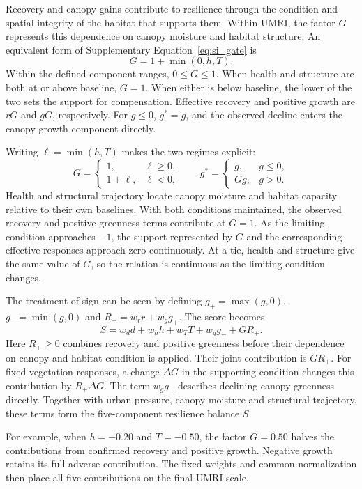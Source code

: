 Recovery and canopy gains contribute to resilience through the condition and spatial integrity of the habitat that supports them. Within UMRI, the factor $G$ represents this dependence on canopy moisture and habitat structure. An equivalent form of Supplementary Equation~\eqref{eq:si_gate} is
\begin{equation}\label{eq:si_gate_min}
G=1+\min(0,h,T).
\end{equation}
Within the defined component ranges, $0\leq G\leq1$. When health and structure are both at or above baseline, $G=1$. When either is below baseline, the lower of the two sets the support for compensation. Effective recovery and positive growth are $rG$ and $gG$, respectively. For $g\leq0$, $g^\ast=g$, and the observed decline enters the canopy-growth component directly.

Writing $\ell=\min(h,T)$ makes the two regimes explicit:
\[
G=\begin{cases}1,&\ell\geq0,\\1+\ell,&\ell<0,\end{cases}
\qquad
g^\ast=\begin{cases}g,&g\leq0,\\Gg,&g>0.\end{cases}
\]
Health and structural trajectory locate canopy moisture and habitat capacity relative to their own baselines. With both conditions maintained, the observed recovery and positive greenness terms contribute at $G=1$. As the limiting condition approaches $-1$, the support represented by $G$ and the corresponding effective responses approach zero continuously. At a tie, health and structure give the same value of $G$, so the relation is continuous as the limiting condition changes.

The treatment of sign can be seen by defining $g_+=\max(g,0)$, $g_-=\min(g,0)$ and $R_+=w_rr+w_gg_+$. The score becomes
\[
S=w_dd+w_hh+w_TT+w_gg_-+G R_+.
\]
Here $R_+\geq0$ combines recovery and positive greenness before their dependence on canopy and habitat condition is applied. Their joint contribution is $GR_+$. For fixed vegetation responses, a change $\Delta G$ in the supporting condition changes this contribution by $R_+\Delta G$. The term $w_gg_-$ describes declining canopy greenness directly. Together with urban pressure, canopy moisture and structural trajectory, these terms form the five-component resilience balance $S$.

For example, when $h=-0.20$ and $T=-0.50$, the factor $G=0.50$ halves the contributions from confirmed recovery and positive growth. Negative growth retains its full adverse contribution. The fixed weights and common normalization then place all five contributions on the final UMRI scale.

